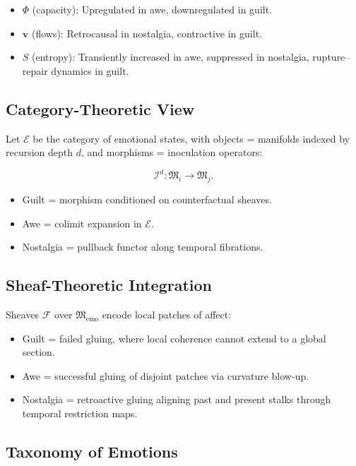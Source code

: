 \documentclass{article}
\theoremstyle{definition}
\begin{document}
\begin{itemize}
  \item $\Phi$ (capacity): Upregulated in awe, downregulated in guilt.  
  \item $\mathbf{v}$ (flows): Retrocausal in nostalgia, contractive in guilt.  
  \item $S$ (entropy): Transiently increased in awe, suppressed in nostalgia, 
        rupture–repair dynamics in guilt.  
\end{itemize}

\subsection{Category-Theoretic View}

Let $\mathcal{E}$ be the category of emotional states, 
with objects = manifolds indexed by recursion depth $d$, 
and morphisms = inoculation operators:

\[
\mathcal{I}^d : \mathfrak{M}_i \to \mathfrak{M}_j.
\]

\begin{itemize}
  \item Guilt = morphism conditioned on counterfactual sheaves.  
  \item Awe = colimit expansion in $\mathcal{E}$.  
  \item Nostalgia = pullback functor along temporal fibrations.  
\end{itemize}

\subsection{Sheaf-Theoretic Integration}

Sheaves $\mathcal{F}$ over $\mathfrak{M}_{\text{emo}}$ encode 
local patches of affect:

\begin{itemize}
  \item Guilt = failed gluing, where local coherence cannot extend 
        to a global section.  
  \item Awe = successful gluing of disjoint patches via curvature blow-up.  
  \item Nostalgia = retroactive gluing aligning past and present stalks 
        through temporal restriction maps.  
\end{itemize}

\subsection{Taxonomy of Emotions}
\end{document}

